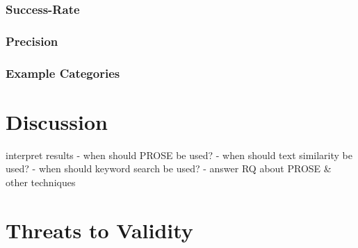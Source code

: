 \documentclass[\myrootdir/main.tex]{subfiles}
\begin{document}
\subsubsection{Success-Rate}
\subsubsection{Precision}
\subsubsection{Example Categories}

\section{Discussion}

interpret results - when should PROSE be used? - when should text similarity be used? - when should keyword search be used? - answer RQ about PROSE \& other techniques
\section{Threats to Validity}
\end{document}
